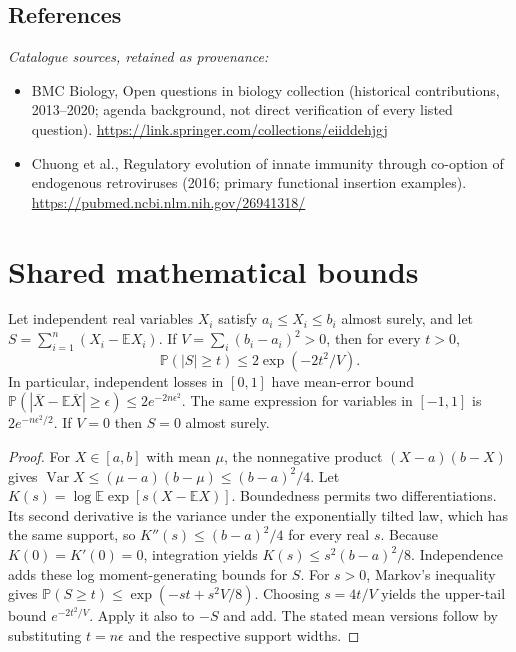 \documentclass[11pt]{article}
\begin{document}
\subsection{References}
\noindent\emph{Catalogue sources, retained as provenance:}
\begin{itemize}
\item BMC Biology, Open questions in biology collection (historical contributions, 2013--2020; agenda background, not direct verification of every listed question). \url{https://link.springer.com/collections/eiiddehjgj}
\item Chuong et al., Regulatory evolution of innate immunity through co-option of endogenous retroviruses (2016; primary functional insertion examples). \url{https://pubmed.ncbi.nlm.nih.gov/26941318/}
\end{itemize}




\section{Shared mathematical bounds}\label{app:bounds}
\begin{lemma}\label{lem:bounded}
Let independent real variables $X_i$ satisfy $a_i\leq X_i\leq b_i$ almost surely,
and let $S=\sum_{i=1}^n(X_i-\mathbb{E} X_i)$. If
$V=\sum_i(b_i-a_i)^2>0$, then for every $t>0$,
\[
 \mathbb{P}(|S|\geq t)\leq 2\exp(-2t^2/V).
\]
In particular, independent losses in $[0,1]$ have mean-error bound
$\mathbb{P}(|\overline X-\mathbb{E}\overline X|\geq\epsilon)
\leq2e^{-2n\epsilon^2}$. The same expression for variables in $[-1,1]$
is $2e^{-n\epsilon^2/2}$. If $V=0$ then $S=0$ almost surely.
\end{lemma}
\begin{proof}
For $X\in[a,b]$ with mean $\mu$, the nonnegative product
$(X-a)(b-X)$ gives
$\operatorname{Var} X\leq(\mu-a)(b-\mu)\leq(b-a)^2/4$.
Let $K(s)=\log\mathbb{E}\exp[s(X-\mathbb{E} X)]$.
Boundedness permits two differentiations. Its second derivative is the variance
under the exponentially tilted law, which has the same support, so
$K''(s)\leq(b-a)^2/4$ for every real $s$.
Because $K(0)=K'(0)=0$, integration yields
$K(s)\leq s^2(b-a)^2/8$.
Independence adds these log moment-generating bounds for $S$.
For $s>0$, Markov's inequality gives
$\mathbb{P}(S\geq t)\leq\exp(-st+s^2V/8)$.
Choosing $s=4t/V$ yields the upper-tail bound $e^{-2t^2/V}$.
Apply it also to $-S$ and add. The stated mean versions follow by substituting
$t=n\epsilon$ and the respective support widths.
\end{proof}
\end{document}
